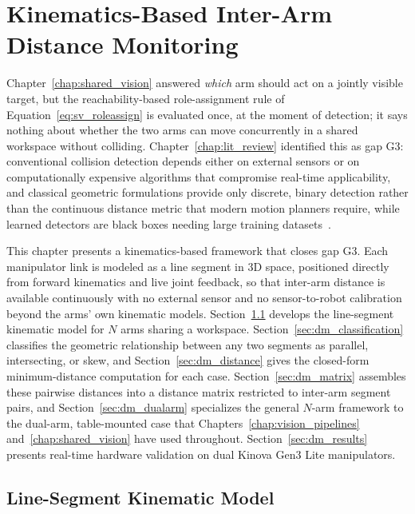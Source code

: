 \chapter{Kinematics-Based Inter-Arm Distance Monitoring}
\label{chap:distance}

Chapter~\ref{chap:shared_vision} answered \emph{which} arm should act on a jointly visible target,
but the reachability-based role-assignment rule of Equation~\eqref{eq:sv_roleassign} is evaluated
once, at the moment of detection; it says nothing about whether the two arms can move concurrently
in a shared workspace without colliding. Chapter~\ref{chap:lit_review} identified this as gap G3:
conventional collision detection depends either on external sensors or on computationally expensive
algorithms that compromise real-time applicability, and classical geometric formulations provide
only discrete, binary detection rather than the continuous distance metric that modern motion
planners require, while learned detectors are black boxes needing large training
datasets~\citep{sk2025distance,surya2025iapf}.

This chapter presents a kinematics-based framework that closes gap G3. Each manipulator link is
modeled as a line segment in 3D space, positioned directly from forward kinematics and live joint
feedback, so that inter-arm distance is available continuously with no external sensor and no
sensor-to-robot calibration beyond the arms' own kinematic models. Section~\ref{sec:dm_model}
develops the line-segment kinematic model for $N$ arms sharing a workspace.
Section~\ref{sec:dm_classification} classifies the geometric relationship between any two segments
as parallel, intersecting, or skew, and Section~\ref{sec:dm_distance} gives the closed-form
minimum-distance computation for each case. Section~\ref{sec:dm_matrix} assembles these pairwise
distances into a distance matrix restricted to inter-arm segment pairs, and
Section~\ref{sec:dm_dualarm} specializes the general $N$-arm framework to the dual-arm, table-mounted
case that Chapters~\ref{chap:vision_pipelines} and~\ref{chap:shared_vision} have used throughout.
Section~\ref{sec:dm_results} presents real-time hardware validation on dual Kinova Gen3 Lite
manipulators.

\section{Line-Segment Kinematic Model}\label{sec:dm_model}

